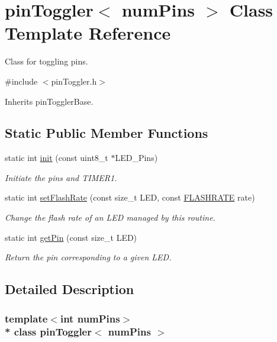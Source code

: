 \hypertarget{classpin_toggler}{}\section{pin\+Toggler$<$ num\+Pins $>$ Class Template Reference}
\label{classpin_toggler}


Class for toggling pins.  




{\ttfamily \#include $<$pin\+Toggler.\+h$>$}



Inherits pin\+Toggler\+Base.

\subsection*{Static Public Member Functions}
\begin{DoxyCompactItemize}
\item 
static int \hyperlink{classpin_toggler_aa58211817601d0e2dd413eb63e41f773}{init} (const uint8\+\_\+t $\ast$L\+E\+D\+\_\+\+Pins)
\begin{DoxyCompactList}\small\item\em Initiate the pins and T\+I\+M\+E\+R1. \end{DoxyCompactList}\item 
static int \hyperlink{classpin_toggler_a42ae0ac4f841dae592195f26bffb109e}{set\+Flash\+Rate} (const size\+\_\+t L\+ED, const \hyperlink{pin_toggler_8h_a8f10e927d4361fa9c8ecfc7a0b163943}{F\+L\+A\+S\+H\+R\+A\+TE} rate)
\begin{DoxyCompactList}\small\item\em Change the flash rate of an L\+ED managed by this routine. \end{DoxyCompactList}\item 
static int \hyperlink{classpin_toggler_a07d46769a8b3fc20758bfb41b240179a}{get\+Pin} (const size\+\_\+t L\+ED)
\begin{DoxyCompactList}\small\item\em Return the pin corresponding to a given L\+ED. \end{DoxyCompactList}\end{DoxyCompactItemize}


\subsection{Detailed Description}
\subsubsection*{template$<$int num\+Pins$>$\\*
class pin\+Toggler$<$ num\+Pins $>$}

